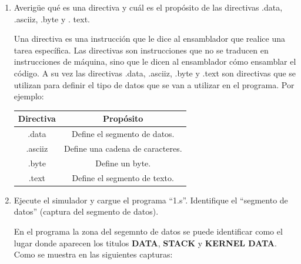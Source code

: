 \documentclass{templateNote}
\begin{document}
\begin{enumerate}[label=\alph*)]
    \item Averigüe qué es una directiva y cuál es el propósito de las directivas .data, .asciiz, .byte y . text. 
    
    Una directiva es una instrucción que le dice al ensamblador que realice una tarea específica. Las directivas son instrucciones que no se traducen en instrucciones de máquina, sino que le dicen al ensamblador cómo ensamblar el código. A su vez las directivas .data, .asciiz, .byte y .text son directivas que se utilizan para definir el tipo de datos que se van a utilizar en el programa. Por ejemplo:
    \begin{center}
        \begin{tabular}{|c|c|}
            \hline
            \textbf{Directiva} & \textbf{Propósito} \\
            \hline
            .data & Define el segmento de datos. \\
            \hline
            .asciiz & Define una cadena de caracteres. \\
            \hline
            .byte & Define un byte. \\
            \hline
            .text & Define el segmento de texto. \\
            \hline
        \end{tabular}
    \end{center}
    \item Ejecute el simulador y cargue el programa “1.s”. Identifique el “segmento de datos” (captura del segmento de datos).
    
    En el programa la zona del segemnto de datos se puede identificar como el lugar donde aparecen los titulos \textbf{DATA}, \textbf{STACK} y \textbf{KERNEL DATA}. Como se muestra en las siguientes capturas: 


\end{enumerate}
\end{document}
